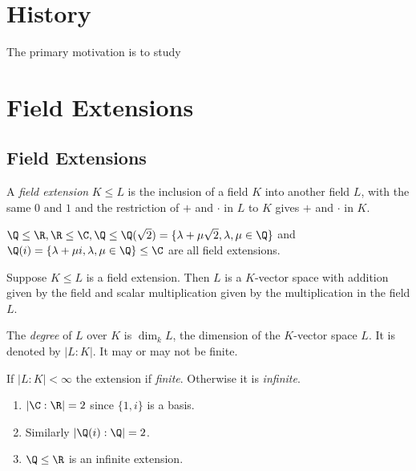 \documentclass[a4paper]{article}
\begin{document}


\tableofcontents

\setcounter{section}{-1}

\section{History}

The primary motivation is to study
%
%
%

\blindtext

\section{Field Extensions}

\subsection{Field Extensions}

\begin{definition}
  A \emph{field extension} \(K \leq L\) is the inclusion of a field \(K\) into another field \(L\), with the same \(0\) and \(1\) and the restriction of \(+\) and \(\cdot\) in \(L\) to \(K\) gives \(+\) and \(\cdot\) in \(K\).
\end{definition}

\begin{eg}
  \(\Q \leq \R, \R \leq \C, \Q \leq \Q(\sqrt 2) = \{\lambda + \mu \sqrt 2, \lambda, \mu \in \Q\}\) and \(\Q(i) = \{\lambda + \mu i, \lambda, \mu \in \Q\} \leq \C\) are all field extensions.
\end{eg}

Suppose \(K \leq L\) is a field extension. Then \(L\) is a \(K\)-vector space with addition given by the field and scalar multiplication given by the multiplication in the field \(L\).

\begin{definition}
  The \emph{degree} of \(L\) over \(K\) is \(\dim_kL\), the dimension of the \(K\)-vector space \(L\). It is denoted by \(|L:K|\). It may or may not be finite.
\end{definition}

\begin{definition}
  If \(|L:K| < \infty\) the extension if \emph{finite}. Otherwise it is \emph{infinite}.
\end{definition}

\begin{eg}\leavevmode
  \begin{enumerate}
  \item \(|\C:\R| = 2\) since \(\{1, i\}\) is a basis.
  \item Similarly \(|\Q(i):\Q| = 2\).
  \item \(\Q \leq \R\) is an infinite extension.
  \end{enumerate}
\end{eg}
\end{document}
